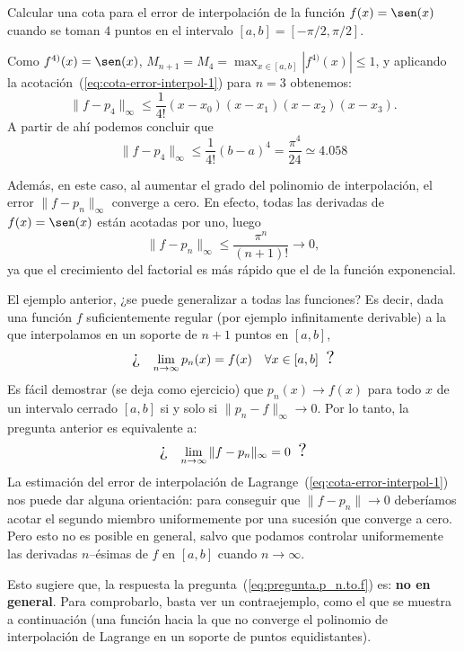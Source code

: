 \begin{example}
  \label{ex:expresion-del-error-interpol}
  Calcular una cota para el error de interpolación de la función
  $f(x)=\sen(x)$ cuando se toman $4$ puntos en el intervalo $[a,b]=[-\pi/2,\pi/2]$.

  Como $f^{4)}(x)=\sen(x)$, $M_{n+1}=M_4=\max_{x\in
    [a,b]}|f^{4)}(x)|\le 1$, y aplicando la
  acotación~(\ref{eq:cota-error-interpol-1}) para $n=3$ obtenemos:
  \begin{equation*}
    \|f-p_4\|_\infty \le \frac{1}{4!}(x-x_0)(x-x_1)(x-x_2)(x-x_3).
  \end{equation*}
  A partir de ahí podemos concluir que
  \begin{equation*}
    \|f-p_4\|_\infty \le \frac{1}{4!}(b-a)^4 = \frac{\pi^4}{24}
    \simeq 4.058
  \end{equation*}

  Además, en este caso, al
  aumentar el grado del polinomio de interpolación, el error
  $\|f-p_n\|_\infty$ converge a cero. En efecto, todas las derivadas
  de $f(x)=\sen(x)$ están acotadas por uno, luego
  \begin{equation*}
    \|f-p_n\|_\infty\le \frac{\pi^n}{(n+1)!} \to 0,
  \end{equation*}
  ya que el crecimiento del factorial es más rápido que el de la
  función exponencial.
\end{example}
\begin{remark}
  El ejemplo anterior, ¿se puede generalizar a todas las funciones? Es decir, dada una
  función $f$ suficientemente regular (por ejemplo infinitamente
  derivable) a la que interpolamos en un soporte de $n+1$ puntos en
  $[a,b]$,
  \begin{equation}
    \text{\Large ¿ \;}
    \lim_{n\to\infty} p_n(x) = f(x) \quad \forall x\in [a,b]
    \text{\; \Large?}
    \label{eq:pregunta.p_n.to.f}
  \end{equation}
  Es fácil demostrar (se deja como ejercicio) que $p_n(x)\to f(x)$
  para todo $x$ de un intervalo cerrado $[a,b]$ si y solo si $\|p_n -
  f\|_\infty\to 0$. Por lo tanto, la pregunta anterior es equivalente
  a:
  \begin{equation*}
    \text{\Large ¿ \;}
    \lim_{n\to\infty} \|f-p_n\|_\infty=0
    \text{\; \Large ?}
  \end{equation*}
  La estimación del error de interpolación de
  Lagrange~(\ref{eq:cota-error-interpol-1}) nos puede dar alguna
  orientación: para conseguir que
  $\|f-p_n\|\to 0$ deberíamos acotar el segundo miembro uniformemente
  por una sucesión que converge a cero. Pero esto  no es posible en
  general, salvo que podamos controlar uniformemente las derivadas
  $n$--ésimas de $f$ en $[a,b]$ cuando $n\to \infty$.

  Esto sugiere que, la respuesta la
  pregunta~(\ref{eq:pregunta.p_n.to.f}) es: \textbf{no en
    general}. Para comprobarlo, basta ver un contraejemplo, como el
  que se muestra a continuación (una función hacia la que no
  converge el polinomio de interpolación de Lagrange en un soporte de
  puntos equidistantes).
\end{remark}

